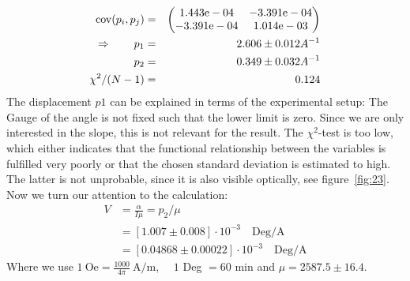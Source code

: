 \begin{eqnarray}
    \mathrm{cov}(p_i, p_j) &=& 
    \begin{pmatrix}
        1.443\mathrm{e}-04 &-3.391\mathrm{e}-04 \\
        -3.391\mathrm{e}-04 &1.014\mathrm{e}-03 \\
    \end{pmatrix}
\\ \Rightarrow \qquad
    p_1 &=& 2.606 \pm 0.012 A^{-1}\\
    p_2 &=& 0.349 \pm 0.032 A^{-1} \\
    \chi ^2/(N-1) &=&  0.124
\end{eqnarray}
The displacement $p1$ can be explained in terms of the experimental setup: The Gauge of the 
angle is not fixed such that the lower limit is zero. Since we are only interested in the slope,
this is not relevant for the result. The $\chi^2$-test is too low, which either indicates that
the functional relationship between the variables is fulfilled very poorly or that the chosen
standard deviation is estimated to high. The latter is not unprobable, since it is also
visible optically, see figure~\ref{fig:23}. Now we turn our attention to the calculation:
\begin{align}
    V &= \frac{\alpha}{I\mu}   = p_2 / \mu \\
      &= \left [ 1.007 \pm 0.008 \right ]\cdot 10^{-3} \quad \mathrm{Deg/A} \\
      &= \left [ 0.04868 \pm 0.00022 \right ] \cdot 10^{-3} \quad \mathrm{Deg/A}
\end{align}
Where we use $1\ \mathrm{Oe} = \frac{1000}{4\pi}\ \mathrm{A/m}$, $\quad1$ Deg $=60$ min \quad and $\mu = 2587.5\pm16.4$.

